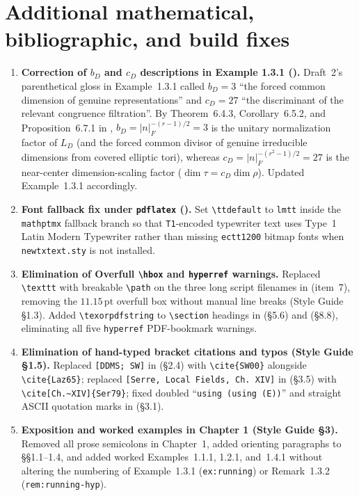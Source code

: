 \documentclass[12pt,letterpaper]{amsart}
\begin{document}
\section{Additional mathematical, bibliographic, and build fixes}
\begin{enumerate}[leftmargin=*]
\item \textbf{Correction of $b_D$ and $c_D$ descriptions in Example 1.3.1 ().}
Draft~2's parenthetical gloss in Example~1.3.1 called $b_D=3$ ``the forced common dimension of genuine representations'' and $c_D=27$ ``the discriminant of the relevant congruence filtration''. By Theorem~6.4.3, Corollary~6.5.2, and Proposition~6.7.1 in , $b_D=|n|_F^{-(r-1)/2}=3$ is the unitary normalization factor of $L_D$ (and the forced common divisor of genuine irreducible dimensions from covered elliptic tori), whereas $c_D=|n|_F^{-(r^2-1)/2}=27$ is the near-center dimension-scaling factor ($\dim\tau = c_D\dim\rho$). Updated Example~1.3.1 accordingly.
\item \textbf{Font fallback fix under \texttt{pdflatex} ().}
Set \texttt{\textbackslash ttdefault} to \texttt{lmtt} inside the \texttt{mathptmx} fallback branch so that \texttt{T1}-encoded typewriter text uses Type~1 Latin Modern Typewriter rather than missing \texttt{ectt1200} bitmap fonts when \texttt{newtxtext.sty} is not installed.
\item \textbf{Elimination of Overfull \texttt{\textbackslash hbox} and \texttt{hyperref} warnings.}
Replaced \verb|\texttt| with breakable \verb|\path| on the three long script filenames in  (item~7), removing the $11.15\,\mathrm{pt}$ overfull box without manual line breaks (Style Guide \S1.3). Added \verb|\texorpdfstring| to \verb|\section| headings in  (\S5.6) and  (\S8.8), eliminating all five \texttt{hyperref} PDF-bookmark warnings.
\item \textbf{Elimination of hand-typed bracket citations and typos (Style Guide \S1.5).}
Replaced \texttt{[DDMS; SW]} in  (\S2.4) with \verb|\cite{SW00}| alongside \verb|\cite{Laz65}|; replaced \texttt{[Serre, Local Fields, Ch.~XIV]} in  (\S3.5) with \verb|\cite[Ch.~XIV]{Ser79}|; fixed doubled ``\texttt{using (using (E))}'' and straight ASCII quotation marks in  (\S3.1).
\item \textbf{Exposition and worked examples in Chapter 1 (Style Guide \S3).}
Removed all prose semicolons in Chapter~1, added orienting paragraphs to \S\S1.1--1.4, and added worked Examples~1.1.1, 1.2.1, and~1.4.1 without altering the numbering of Example~1.3.1 (\verb|ex:running|) or Remark~1.3.2 (\verb|rem:running-hyp|).
\end{enumerate}
\end{document}
